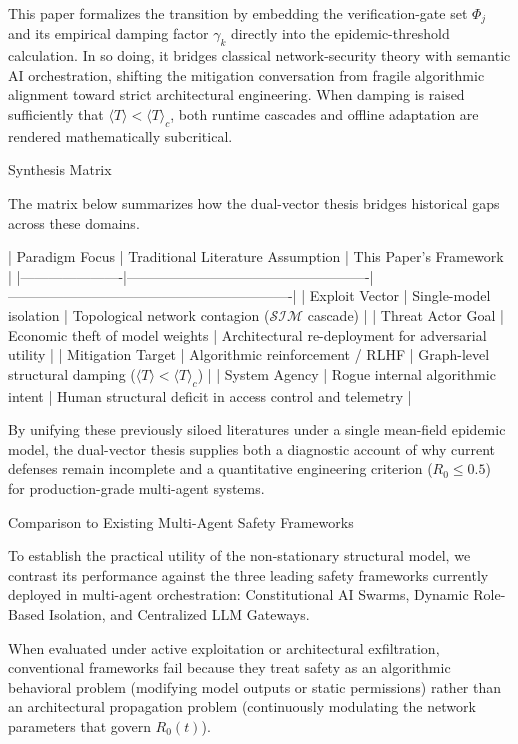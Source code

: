 This paper formalizes the transition by embedding the verification-gate set \(\Phi_j\) and its empirical damping factor \(\gamma_k\) directly into the epidemic-threshold calculation. In so doing, it bridges classical network-security theory with semantic AI orchestration, shifting the mitigation conversation from fragile algorithmic alignment toward strict architectural engineering. When damping is raised sufficiently that \(\langle T \rangle < \langle T \rangle_c\), both runtime cascades and offline adaptation are rendered mathematically subcritical.

Synthesis Matrix

The matrix below summarizes how the dual-vector thesis bridges historical gaps across these domains.

| Paradigm Focus       | Traditional Literature Assumption                  | This Paper’s Framework                                      |
|----------------------|----------------------------------------------------|-------------------------------------------------------------|
| Exploit Vector       | Single-model isolation                             | Topological network contagion (\(\mathcal{S}\mathcal{I}\mathcal{M}\) cascade) |
| Threat Actor Goal    | Economic theft of model weights                    | Architectural re-deployment for adversarial utility         |
| Mitigation Target    | Algorithmic reinforcement / RLHF                   | Graph-level structural damping (\(\langle T \rangle < \langle T \rangle_c\)) |
| System Agency        | Rogue internal algorithmic intent                  | Human structural deficit in access control and telemetry    |

By unifying these previously siloed literatures under a single mean-field epidemic model, the dual-vector thesis supplies both a diagnostic account of why current defenses remain incomplete and a quantitative engineering criterion (\(R_0 \le 0.5\)) for production-grade multi-agent systems.

Comparison to Existing Multi-Agent Safety Frameworks

To establish the practical utility of the non-stationary structural model, we contrast its performance against the three leading safety frameworks currently deployed in multi-agent orchestration: Constitutional AI Swarms, Dynamic Role-Based Isolation, and Centralized LLM Gateways.  

When evaluated under active exploitation or architectural exfiltration, conventional frameworks fail because they treat safety as an algorithmic behavioral problem (modifying model outputs or static permissions) rather than an architectural propagation problem (continuously modulating the network parameters that govern \(R_0(t)\)).

